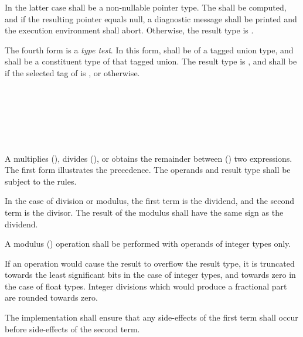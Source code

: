 In the latter case  shall be a
non-nullable pointer type. The  shall be computed,
and if the resulting pointer equals null, a diagnostic message shall be printed
and the execution environment shall abort. Otherwise, the result type is
.

\specsubsubitem
The fourth form is a \textit{type test}. In this form,
 shall be of a tagged union type, and
 shall be a constituent type of that tagged union. The result
type is , and shall be  if the selected tag of
 is , or 
otherwise.


\begin{grammar}
 \\
	 \\
	 \terminal{*}  \\
	 \terminal{/}  \\
	 \terminal{\%}  \\
\end{grammar}

\specsubsubitem
A  multiplies (\terminal{*}), divides
(\terminal{/}), or obtains the remainder between (\terminal{\%}) two
expressions. The first form illustrates the precedence. The operands and result
type shall be subject to the  rules.

\specsubsubitem
In the case of division or modulus, the first term is the dividend, and the
second term is the divisor. The result of the modulus shall have the same sign
as the dividend.

\specsubsubitem
A modulus (\terminal{\%}) operation shall be performed with operands of integer
types only.

\specsubsubitem
If an operation would cause the result to overflow the result type, it is
truncated towards the least significant bits in the case of integer types, and
towards zero in the case of float types. Integer divisions which would produce
a fractional part are rounded towards zero.

\specsubsubitem
The implementation shall ensure that any side-effects of the first term shall
occur before side-effects of the second term.

